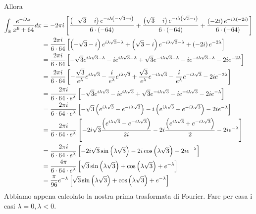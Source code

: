 Allora
\begin{align*}
\int _{\mathbb{R} }\frac{e^{ - i\lambda x}}{x^{6} + 64} dx & = - 2\pi i\left[\frac{\left(- \sqrt{3} - i\right) e^{ - i\lambda \left(- \sqrt{3} - i\right)}}{6\cdot \left(- 64\right)} + \frac{\left(\sqrt{3} - i\right) e^{ - i\lambda \left(\sqrt{3} - i\right)}}{6\cdot \left(- 64\right)} + \frac{\left(- 2i\right) e^{ - i\lambda \left(- 2i\right)}}{6\cdot \left(- 64\right)}\right]\\
 & = \frac{2\pi i}{6\cdot 64}\left[\left(- \sqrt{3} - i\right) e^{i\lambda \sqrt{3} - \lambda } + \left(\sqrt{3} - i\right) e^{ - i\lambda \sqrt{3} - \lambda } + \left(- 2i\right) e^{ - 2\lambda }\right]\\
 & = \frac{2\pi i}{6\cdot 64}\left[ - \sqrt{3} e^{i\lambda \sqrt{3} - \lambda } - ie^{i\lambda \sqrt{3} - \lambda } + \sqrt{3} e^{ - i\lambda \sqrt{3} - \lambda } - ie^{ - i\lambda \sqrt{3} - \lambda } - 2ie^{ - 2\lambda }\right]\\
 & = \frac{2\pi i}{6\cdot 64}\left[ - \frac{\sqrt{3}}{e^{\lambda }} e^{i\lambda \sqrt{3}} - \frac{i}{e^{\lambda }} e^{i\lambda \sqrt{3}} + \frac{\sqrt{3}}{e^{\lambda }} e^{ - i\lambda \sqrt{3}} - \frac{i}{e^{\lambda }} e^{ - i\lambda \sqrt{3}} - 2ie^{ - 2\lambda }\right]\\
 & = \frac{2\pi i}{6\cdot 64\cdot e^{\lambda }}\left[ - \sqrt{3} e^{i\lambda \sqrt{3}} - ie^{i\lambda \sqrt{3}} + \sqrt{3} e^{ - i\lambda \sqrt{3}} - ie^{ - i\lambda \sqrt{3}} - 2ie^{ - \lambda }\right]\\
 & = \frac{2\pi i}{6\cdot 64\cdot e^{\lambda }}\left[ - \sqrt{3}\left(e^{i\lambda \sqrt{3}} - e^{ - i\lambda \sqrt{3}}\right) - i\left(e^{i\lambda \sqrt{3}} + e^{ - i\lambda \sqrt{3}}\right) - 2ie^{ - \lambda }\right]\\
 & = \frac{2\pi i}{6\cdot 64\cdot e^{\lambda }}\left[ - 2i\sqrt{3}\frac{\left(e^{i\lambda \sqrt{3}} - e^{ - i\lambda \sqrt{3}}\right)}{2i} - 2i\frac{\left(e^{i\lambda \sqrt{3}} + e^{ - i\lambda \sqrt{3}}\right)}{2} - 2ie^{ - \lambda }\right]\\
 & = \frac{2\pi i}{6\cdot 64\cdot e^{\lambda }}\left[ - 2i\sqrt{3}\sin\left(\lambda \sqrt{3}\right) - 2i\cos\left(\lambda \sqrt{3}\right) - 2ie^{ - \lambda }\right]\\
 & = \frac{4\pi }{6\cdot 64\cdot e^{\lambda }}\left[\sqrt{3}\sin\left(\lambda \sqrt{3}\right) + \cos\left(\lambda \sqrt{3}\right) + e^{ - \lambda }\right]\\
 & = \frac{\pi }{96} e^{ - \lambda }\left[\sqrt{3}\sin\left(\lambda \sqrt{3}\right) + \cos\left(\lambda \sqrt{3}\right) + e^{ - \lambda }\right]
\end{align*}
Abbiamo appena calcolato la nostra prima trasformata di Fourier. Fare per casa i casi $\lambda = 0,\lambda < 0$.
\Soluzione

